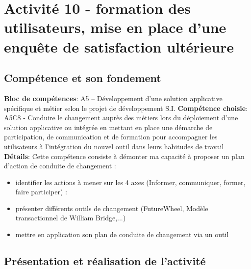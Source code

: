 \documentclass[a4paper, 11pt]{report}
\begin{document}
\section{Activité 10 - formation des utilisateurs, mise en place d’une enquête de satisfaction ultérieure}
\subsection{Compétence et son fondement}
\textbf{Bloc de compétences}: A5 – Développement d’une solution applicative spécifique et métier selon le projet de développement S.I.
\textbf{Compétence choisie}: A5C8 - Conduire le changement auprès des métiers lors du déploiement d’une solution applicative ou intégrée en mettant en place une démarche de participation, de communication et de formation pour accompagner les utilisateurs à l’intégration du nouvel outil dans leurs habitudes de travail
\newline
\textbf{Détails}: Cette compétence consiste à démonter ma capacité à proposer un plan d’action de conduite de changement :
\begin{itemize}
  \item identifier les actions à mener sur les 4 axes (Informer, communiquer, former, faire participer) :
  \item présenter différents outils de changement (FutureWheel, Modèle transactionnel de William Bridge,...)
  \item mettre en application son plan de conduite de changement via un outil
\end{itemize}
\subsection{Présentation et réalisation de l'activité}
\end{document}
